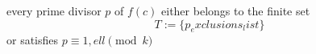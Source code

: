 every prime divisor $p$ of $f(c)$ either belongs to the finite set 
\begin{equation*}
T:=\{{p_exclusions_list}\}
\end{equation*}
or satisfies $p\equiv 1,{ell}\pmod{{k}}$